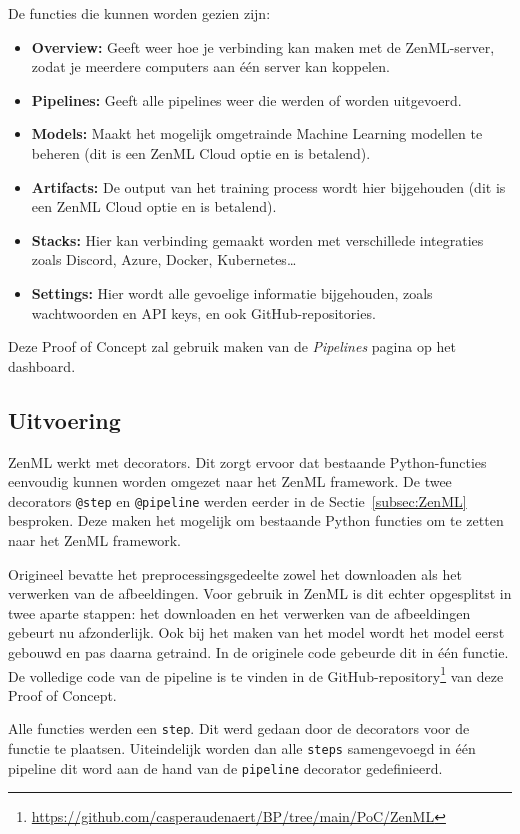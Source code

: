 De functies die kunnen worden gezien zijn:

\begin{itemize}
    \item \textbf{Overview:} Geeft weer hoe je verbinding kan maken met de ZenML-server, zodat je meerdere computers aan één server kan koppelen.
    \item \textbf{Pipelines:} Geeft alle pipelines weer die werden of worden uitgevoerd.
    \item \textbf{Models:} Maakt het mogelijk omgetrainde Machine Learning modellen te beheren (dit is een ZenML Cloud optie en is betalend).
    \item \textbf{Artifacts:} De output van het training process wordt hier bijgehouden (dit is een ZenML Cloud optie en is betalend).
    \item \textbf{Stacks:} Hier kan verbinding gemaakt worden met verschillede integraties zoals Discord, Azure, Docker, Kubernetes\ldots
    \item \textbf{Settings:} Hier wordt alle gevoelige informatie bijgehouden, zoals wachtwoorden en API keys, en ook GitHub-repositories.
\end{itemize}

Deze Proof of Concept zal gebruik maken van de \textit{Pipelines} pagina op het dashboard.

\subsection{Uitvoering}
ZenML werkt met decorators. Dit zorgt ervoor dat bestaande Python-functies eenvoudig kunnen worden omgezet naar het ZenML framework. De twee decorators \texttt{@step} en \texttt{@pipeline} werden eerder in de Sectie~\ref{subsec:ZenML} besproken. Deze maken het mogelijk om bestaande Python functies om te zetten naar het ZenML framework.

Origineel bevatte het preprocessingsgedeelte zowel het downloaden als het verwerken van de afbeeldingen. Voor gebruik in ZenML is dit echter opgesplitst in twee aparte stappen: het downloaden en het verwerken van de afbeeldingen gebeurt nu afzonderlijk. Ook bij het maken van het model wordt het model eerst gebouwd en pas daarna getraind. In de originele code gebeurde dit in één functie.
De volledige code van de pipeline is te vinden in de GitHub-repository\footnote{\url{https://github.com/casperaudenaert/BP/tree/main/PoC/ZenML}} van deze Proof of Concept.

Alle functies werden een \texttt{step}. Dit werd gedaan door de decorators voor de functie te plaatsen. Uiteindelijk worden dan alle \texttt{steps} samengevoegd in één pipeline dit word aan de hand van de \texttt{pipeline} decorator gedefinieerd.
